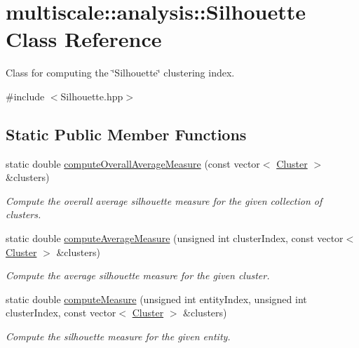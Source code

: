 \hypertarget{classmultiscale_1_1analysis_1_1Silhouette}{\section{multiscale\-:\-:analysis\-:\-:\-Silhouette \-Class \-Reference}
\label{classmultiscale_1_1analysis_1_1Silhouette}
}


\-Class for computing the \char`\"{}\-Silhouette\char`\"{} clustering index.  




{\ttfamily \#include $<$\-Silhouette.\-hpp$>$}

\subsection*{\-Static \-Public \-Member \-Functions}
\begin{DoxyCompactItemize}
\item 
static double \hyperlink{classmultiscale_1_1analysis_1_1Silhouette_a21fab3292947caed2dbab0da542ac24c}{compute\-Overall\-Average\-Measure} (const vector$<$ \hyperlink{classmultiscale_1_1analysis_1_1Cluster}{\-Cluster} $>$ \&clusters)
\begin{DoxyCompactList}\small\item\em \-Compute the overall average silhouette measure for the given collection of clusters. \end{DoxyCompactList}\item 
static double \hyperlink{classmultiscale_1_1analysis_1_1Silhouette_ac2d55f89072bf46c86b8004d6787a820}{compute\-Average\-Measure} (unsigned int cluster\-Index, const vector$<$ \hyperlink{classmultiscale_1_1analysis_1_1Cluster}{\-Cluster} $>$ \&clusters)
\begin{DoxyCompactList}\small\item\em \-Compute the average silhouette measure for the given cluster. \end{DoxyCompactList}\item 
static double \hyperlink{classmultiscale_1_1analysis_1_1Silhouette_a2b418915655903583944d9d2ee9d6db8}{compute\-Measure} (unsigned int entity\-Index, unsigned int cluster\-Index, const vector$<$ \hyperlink{classmultiscale_1_1analysis_1_1Cluster}{\-Cluster} $>$ \&clusters)
\begin{DoxyCompactList}\small\item\em \-Compute the silhouette measure for the given entity. \end{DoxyCompactList}\end{DoxyCompactItemize}
